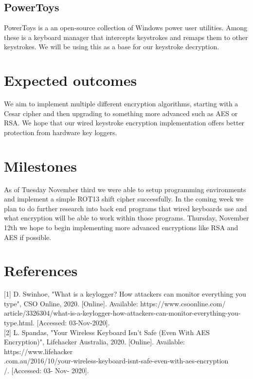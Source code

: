 \documentclass{article}
\begin{document}
\subsection{PowerToys}
PowerToys is a an open-source collection of Windows power user utilities. Among these is a keyboard manager that intercepts keystrokes and remaps them to other keystrokes. We will be using this as a base for our keystroke decryption.

\section{Expected outcomes}
We aim to implement multiple different encryption algorithms, starting with a Cesar cipher and then upgrading to something more advanced such as AES or RSA. We hope that our wired keystroke encryption implementation offers better protection from hardware key loggers.

\section{Milestones}
As of Tuesday November third we were able to setup programming environments and implement a simple ROT13 shift cipher successfully. In the coming week we plan to do further research into back end programs that wired keyboards use and what encryption will be able to work within those programs. Thursday, November 12th we hope to begin implementing more advanced encryptions like RSA and AES if possible.

\section{References}
[1] D. Swinhoe, "What is a keylogger? How attackers can monitor everything you type", CSO Online, 2020. [Online]. Available: https://www.csoonline.com/\\article/3326304/what-is-a-keylogger-how-attackers-can-monitor-everything-you-type.html. [Accessed: 03-Nov-2020]. \\

[2] L. Spandas, "Your Wireless Keyboard Isn't Safe (Even With AES Encryption)", Lifehacker Australia, 2020. [Online]. Available: https://www.lifehacker\\.com.au/2016/10/your-wireless-keyboard-isnt-safe-even-with-aes-encryption\\/. [Accessed: 03- Nov- 2020].
\end{document}
